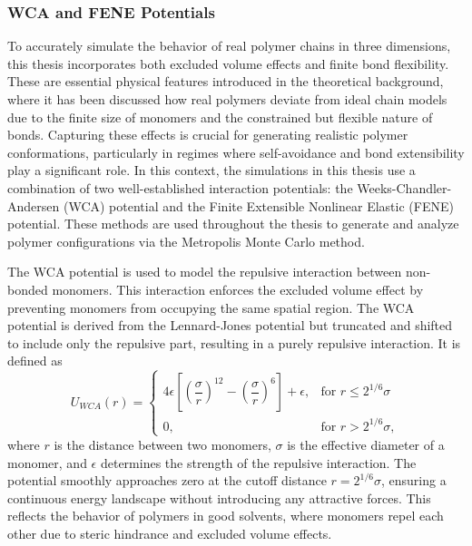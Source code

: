 \documentclass{article}      %
\begin{document}
\subsubsection{WCA and FENE Potentials}
To accurately simulate the behavior of real polymer chains in three dimensions, this thesis incorporates both excluded volume effects and finite bond flexibility. These are essential physical features introduced in the theoretical background, where it has been discussed how real polymers deviate from ideal chain models due to the finite size of monomers and the constrained but flexible nature of bonds. Capturing these effects is crucial for generating realistic polymer conformations, particularly in regimes where self-avoidance and bond extensibility play a significant role. In this context, the simulations in this thesis use a combination of two well-established interaction potentials: the Weeks-Chandler-Andersen (WCA) potential and the Finite Extensible Nonlinear Elastic (FENE) potential. These methods are used throughout the thesis to generate and analyze polymer configurations via the Metropolis Monte Carlo method.

The WCA potential is used to model the repulsive interaction between non-bonded monomers. This interaction enforces the excluded volume effect by preventing monomers from occupying the same spatial region. The WCA potential is derived from the Lennard-Jones potential but truncated and shifted to include only the repulsive part, resulting in a purely repulsive interaction. It is defined as
\begin{equation}
U_{WCA}(r) = 
\begin{cases}
4\epsilon \left[ \left( \dfrac{\sigma}{r} \right)^{12} - \left( \dfrac{\sigma}{r} \right)^6 \right] + \epsilon, & \text{for } r \leq 2^{1/6}\sigma \\
0, & \text{for } r > 2^{1/6}\sigma,
\end{cases}
\end{equation}
where \( r \) is the distance between two monomers, \( \sigma \) is the effective diameter of a monomer, and \( \epsilon \) determines the strength of the repulsive interaction. The potential smoothly approaches zero at the cutoff distance \( r = 2^{1/6}\sigma \), ensuring a continuous energy landscape without introducing any attractive forces. This reflects the behavior of polymers in good solvents, where monomers repel each other due to steric hindrance and excluded volume effects.
\end{document}
